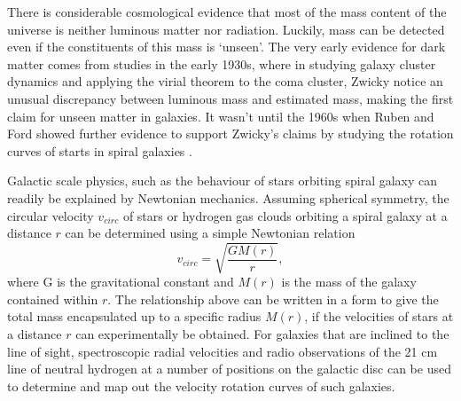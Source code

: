 There is considerable cosmological evidence that most of the mass content of the universe is neither luminous matter nor radiation. Luckily, mass can be detected even if the constituents of this mass is `unseen'. The very early evidence for dark matter comes from studies in the early 1930s, where in studying galaxy cluster dynamics and applying the virial theorem to the coma cluster, Zwicky \cite{Fritz_Zwicky_1993} notice an unusual discrepancy between luminous mass and
estimated mass, making the first claim for unseen matter in galaxies. It wasn't until the 1960s when Ruben and Ford showed further evidence to support Zwicky's claims by studying the rotation curves of starts in spiral galaxies \cite{ruben_ford, ruben_ford_results}.

Galactic scale physics, such as the behaviour of stars orbiting spiral galaxy can readily be explained by Newtonian mechanics. Assuming spherical symmetry, the circular velocity $v_{circ}$ of stars or hydrogen gas clouds orbiting a spiral galaxy at a distance $r$ can be determined using a simple Newtonian relation
%
\begin{equation}
    v_{circ} = \sqrt{\frac{GM(r)}{r}},
\end{equation}
%
where G is the gravitational constant and $M(r)$ is the mass of the galaxy contained within $r$. The relationship above can be written in a form to give the total mass encapsulated up to a specific radius $M(r)$, if the velocities of stars at a distance $r$ can experimentally be obtained. For galaxies that are inclined to the line of sight, spectroscopic radial velocities and radio observations of the 21 cm line of neutral hydrogen at a number of positions on the galactic disc can be used to determine and map out the velocity rotation curves of such galaxies.


